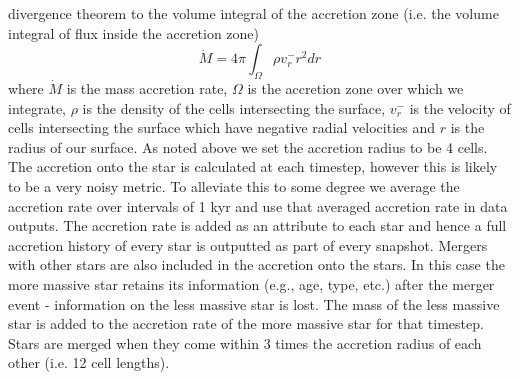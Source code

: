 \documentclass[twocolumn,iop,revtex4]{openjournal}
\begin{document}
divergence theorem to the volume integral of the accretion zone \citep[e.g][]{Bleuler_2014}
(i.e. the volume integral of flux inside the accretion zone)
\begin{equation}
  \dot{M} = 4\pi \int_\Omega { \rho v_r^- r^2 dr}
\end{equation}
where $\dot{M}$ is the mass accretion rate, $\Omega$ is the accretion zone over which we integrate,
$\rho$ is the
density of the cells intersecting the surface, $v_r^-$ is the velocity of cells intersecting
the surface which have negative radial velocities and $r$ is the radius of our surface. As noted above we
set the accretion radius to be 4 cells. The accretion onto the star is calculated at each timestep,
however this is likely to be a very noisy metric. To alleviate this to some degree we average
the accretion rate over intervals of 1 kyr and use that averaged accretion rate in data outputs. The accretion rate is added as an attribute to each star and hence a full
accretion history of every star is outputted as part of every snapshot. Mergers with other stars
are also included in the accretion onto the stars. In this case the more massive star retains its
information (e.g., age, type, etc.) after the merger event - information on the less massive star is
lost. The mass of the less massive star is added to the accretion rate of the more massive star for
that timestep. Stars are merged when they come within 3 times the accretion radius of each other (i.e. 12 cell lengths).\\
\end{document}
